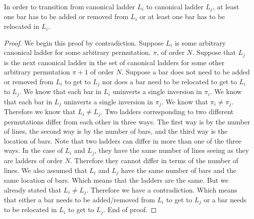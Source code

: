 \begin{theorem}
    In order to transition from canonical ladder $L_{i}$ to canonical ladder $L_{j}$, at least one bar has to be added or 
    removed from $L_{i}$ or at least one bar has to be relocated in $L_{i}$.
\end{theorem}
\begin{proof}
    We begin this proof by contradiction. Suppose $L_{i}$ is some arbitrary canonical ladder for some arbitrary permutation, $\pi$, of 
    order $N$. Suppose that $L_{j}$ is the next canonical ladder in the set of canonical ladders for some other arbitrary permutation $\pi+1$ 
    of order $N$. Suppose a bar does not need to be added or removed from $L_{i}$ to get to $L_{j}$ nor does a bar need to be relocated to get to $L_{i}$ to 
    $L_{j}$. We know that each bar in $L_{i}$ uninverts a single inversion in $\pi_{i}$. We know that each bar in $L_{j}$ 
    uninverts a single inversion in $\pi_{j}$. We know that $\pi_{i} \neq \pi_{j}$. Therefore we know that $L_{i} \neq L_{j}$. Two ladders corresponding to 
    two different permutations differ from each other in three ways. The first way is by the number of lines, the second way is by the number of 
    bars, and the third way is the location of bars. Note that two ladders can differ in more than one of the three ways. In the case 
    of $L_{i}$ and $L_{j}$, they have the same number of lines seeing as they are ladders of order $N$. Therefore they cannot differ in terms 
    of the number of lines. We also assumed that $L_{i}$ and $L_{j}$ have the same number of bars and the same location of bars. Which means 
    that the ladders are the same. But we already stated that $L_{i} \neq L_{j}$. Therefore we have a contradiction. Which means that 
    either a bar needs to be added/removed from $L_{i}$ to get to $L_{j}$ or a bar needs to be relocated in $L_{i}$ to get to $L_{j}$. End of proof.
\end{proof}



